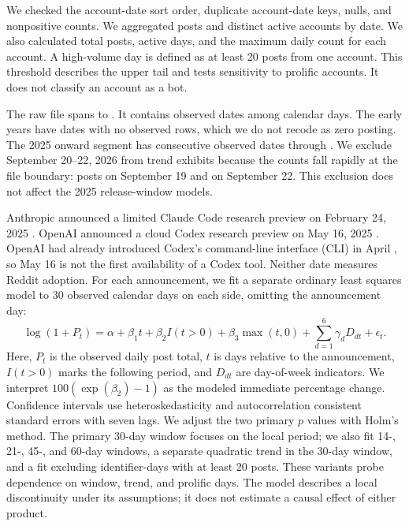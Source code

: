 \documentclass[11pt]{article}
\begin{document}
We checked the account-date sort order, duplicate account-date keys, nulls, and nonpositive counts. We aggregated posts and distinct active accounts by date. We also calculated total posts, active days, and the maximum daily count for each account. A high-volume day is defined as at least 20 posts from one account. This threshold describes the upper tail and tests sensitivity to prolific accounts. It does not classify an account as a bot.

The raw file spans \dataFirstDate{} to \dataLastRawDate{}. It contains \dataObservedDates{} observed dates among \dataCalendarDays{} calendar days. The early years have dates with no observed rows, which we do not recode as zero posting. The 2025 onward segment has \dataRecentDates{} consecutive observed dates through \dataAnalysisEnd{}. We exclude September 20--22, 2026 from trend exhibits because the counts fall rapidly at the file boundary: \dataLastStablePosts{} posts on September 19 and \dataLastDayPosts{} on September 22. This exclusion does not affect the 2025 release-window models.

Anthropic announced a limited Claude Code research preview on February 24, 2025 \cite{anthropic2025}. OpenAI announced a cloud Codex research preview on May 16, 2025 \cite{openai2025}. OpenAI had already introduced Codex's command-line interface (CLI) in April \cite{openaiCli2025}, so May 16 is not the first availability of a Codex tool. Neither date measures Reddit adoption. For each announcement, we fit a separate ordinary least squares model to 30 observed calendar days on each side, omitting the announcement day:
\[
\log(1+P_t)=\alpha+\beta_1 t+\beta_2 I(t>0)+\beta_3\max(t,0)+\sum_{d=1}^{6}\gamma_d D_{dt}+\epsilon_t.
\]
Here, $P_t$ is the observed daily post total, $t$ is days relative to the announcement, $I(t>0)$ marks the following period, and $D_{dt}$ are day-of-week indicators. We interpret $100(\exp(\beta_2)-1)$ as the modeled immediate percentage change. Confidence intervals use heteroskedasticity and autocorrelation consistent standard errors with seven lags. We adjust the two primary $p$ values with Holm's method. The primary 30-day window focuses on the local period; we also fit 14-, 21-, 45-, and 60-day windows, a separate quadratic trend in the 30-day window, and a fit excluding identifier-days with at least 20 posts. These variants probe dependence on window, trend, and prolific days. The model describes a local discontinuity under its assumptions; it does not estimate a causal effect of either product.
\end{document}
